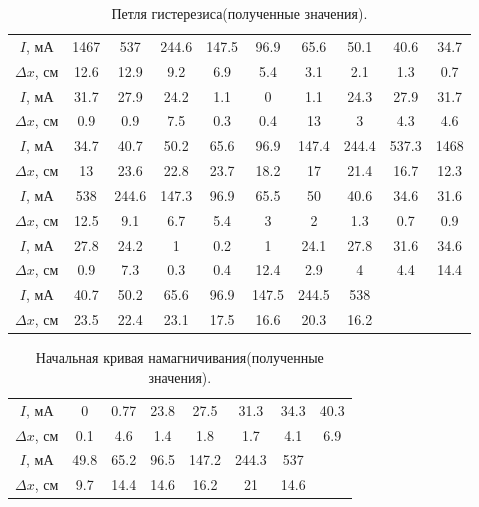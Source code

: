 \documentclass[a4paper, 12pt, twoside]{article}
\begin{document}
\begin{table}[H]
	\centering
	\caption{Петля гистерезиса(полученные значения).}
	\label{pet}
	\begin{tabular}{c|c|c|c|c|c|c|c|c|c}
		\toprule
		$I$, мА        & 1467 & 537   & 244.6 & 147.5 & 96.9  & 65.6  & 50.1  & 40.6               & 34.7              \\ 
		$\Delta x$, см & 12.6 & 12.9  & 9.2   & 6.9   & 5.4   & 3.1   & 2.1   & 1.3                & 0.7               \\ \midrule
		$I$, мА        & 31.7 & 27.9  & 24.2  & 1.1   & 0     & 1.1   & 24.3  & 27.9               & 31.7              \\ 
		$\Delta x$, см & 0.9  & 0.9   & 7.5   & 0.3   & 0.4   & 13    & 3     & 4.3                & 4.6               \\ \midrule
		$I$, мА        & 34.7 & 40.7  & 50.2  & 65.6  & 96.9  & 147.4 & 244.4 & 537.3              & 1468              \\ 
		$\Delta x$, см & 13   & 23.6  & 22.8  & 23.7  & 18.2  & 17    & 21.4  & 16.7               & 12.3              \\ \midrule
		$I$, мА        & 538  & 244.6 & 147.3 & 96.9  & 65.5  & 50    & 40.6  & 34.6               & 31.6              \\ 
		$\Delta x$, см & 12.5 & 9.1   & 6.7   & 5.4   & 3     & 2     & 1.3   & 0.7                & 0.9               \\ \midrule
		$I$, мА        & 27.8 & 24.2  & 1     & 0.2   & 1     & 24.1  & 27.8  & 31.6               & 34.6              \\ 
		$\Delta x$, см & 0.9  & 7.3   & 0.3   & 0.4   & 12.4  & 2.9   & 4     & 4.4                & 14.4              \\ \midrule
		$I$, мА        & 40.7 & 50.2  & 65.6  & 96.9  & 147.5 & 244.5 & 538   & \multicolumn{2}{c}{\multirow{2}{*}{}} \\ 
		$\Delta x$, см & 23.5 & 22.4  & 23.1  & 17.5  & 16.6  & 20.3  & 16.2  & \multicolumn{2}{c}{}                  \\ \bottomrule
	\end{tabular}
\end{table}

\begin{table}[H]
	\centering
	\caption{Начальная кривая намагничивания(полученные значения).}
	\label{nach}
	\begin{tabular}{c|c|c|c|c|c|c|c}
		\toprule
		$I$, мА        & 0    & 0.77 & 23.8 & 27.5  & 31.3  & 34.3 & 40.3 \\ 
		$\Delta x$, см & 0.1  & 4.6  & 1.4  & 1.8   & 1.7   & 4.1  & 6.9  \\ \midrule
		$I$, мА        & 49.8 & 65.2 & 96.5 & 147.2 & 244.3 & 537  &      \\ 
		$\Delta x$, см & 9.7  & 14.4 & 14.6 & 16.2  & 21    & 14.6 &      \\ \bottomrule
	\end{tabular}
\end{table}
\end{document}
